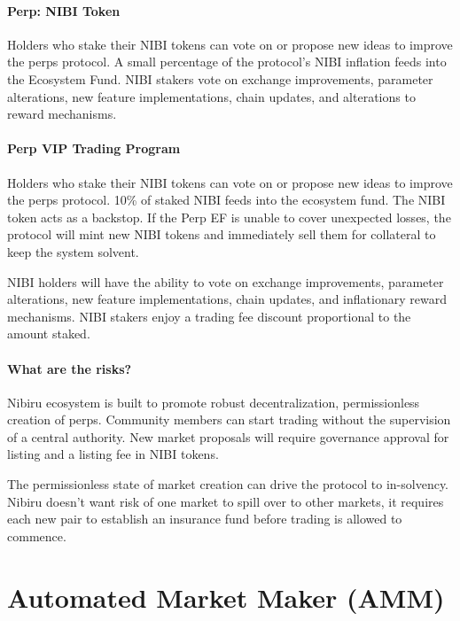 \documentclass[11pt]{article}
\begin{document}
\subsection*{Perp: NIBI Token}
Holders who stake their NIBI tokens can vote on or propose new ideas to improve the perps protocol.  A small percentage of the protocol's NIBI inflation feeds into the Ecosystem Fund. NIBI stakers vote on exchange improvements, parameter alterations, new feature implementations, chain updates, and alterations to reward mechanisms.

\subsection*{Perp VIP Trading Program}

Holders who stake their NIBI tokens can vote on or propose new ideas to improve the perps protocol. 10\% of staked NIBI feeds into the ecosystem fund. The NIBI token acts as a backstop. If the Perp EF is unable to cover unexpected losses, the protocol will mint new NIBI tokens and immediately sell them for collateral to keep the system solvent.

NIBI holders will have the ability to vote on exchange improvements, parameter alterations, new feature implementations, chain updates, and inflationary reward mechanisms. NIBI stakers enjoy a trading fee discount proportional to the amount staked.


\subsection{What are the risks?}

Nibiru ecosystem is built to promote robust decentralization, permissionless creation of perps. Community members can start trading without the supervision of a central authority. New market proposals will require governance approval for listing and a listing fee in NIBI tokens. 

The permissionless state of market creation can drive the protocol to
in-solvency. Nibiru doesn’t want risk of one market to spill over to other markets, it requires each new pair to establish an insurance fund before trading is allowed to commence.


\part{Automated Market Maker (AMM)}
\end{document}
